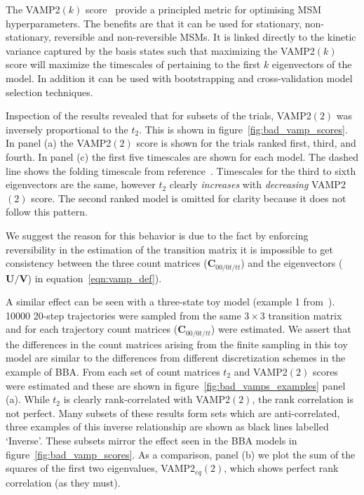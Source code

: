 \documentclass[journal=jacsat,manuscript=article]{achemso}
\begin{document}
The VAMP2$(k)$ score~\cite{wuVariationalApproachLearning2020c} provide a principled metric for optimising MSM hyperparameters. The benefits are that it can be used for stationary, non-stationary, reversible and non-reversible MSMs. It is linked directly to the kinetic variance captured by the basis states such that maximizing the VAMP2$(k)$ score will maximize the timescales of pertaining to the first $k$ eigenvectors of the model. In addition it can be used with bootstrapping and cross-validation model selection techniques. 

Inspection of the results revealed that for subsets of the trials, VAMP2$(2)$ was inversely proportional to the $t_2$. This is shown in figure~\ref{fig:bad_vamp_scores}. In panel (a) the VAMP2$(2)$ score is shown for the trials ranked first, third, and fourth. In panel (c) the first five timescales are shown for each model.  The dashed line shows the folding timescale from reference~\cite{lindorff-larsen_how_2011}. Timescales for the third to sixth eigenvectors are the same, however $t_2$ clearly \emph{increases} with \emph{decreasing} VAMP2$(2)$ score. The second ranked model is omitted for clarity because it does not follow this pattern. 

We suggest the reason for this behavior is due to the fact by enforcing reversibility in the estimation of the transition matrix it is impossible to get consistency between the three count matrices ($\mathbf{C}_{00/0t/tt}$) and the eigenvectors ($\mathbf{U}/\mathbf{V}$) in equation~\ref{eqn:vamp_def}). 

A similar effect can be seen with a three-state toy model (example 1 from~\cite{trendelkamp-schroer_estimation_2015}). \num{10000} 20-step trajectories were sampled from the same $3\times 3$ transition matrix and for each trajectory count matrices ($\mathbf{C}_{00/0t/tt}$) were estimated.  We assert that the differences in the count matrices arising from the finite sampling in this toy model are similar to the differences from different  discretization schemes in the example of BBA.  From each set of count matrices $t_2$ and VAMP2$(2)$ scores were estimated and  these are shown in figure~\ref{fig:bad_vamps_examples} panel (a). While  $t_2$ is clearly rank-correlated with VAMP2$(2)$, the rank correlation is not perfect.  Many subsets of these results  form sets which are anti-correlated,  three examples of this inverse relationship are shown as black lines labelled `Inverse'. These subsets mirror the effect seen in the BBA models in figure~\ref{fig:bad_vamp_scores}.  As a comparison, panel (b) we plot the sum of the squares of the first two eigenvalues, VAMP2$_{eq}(2)$, which shows perfect rank correlation (as they must). 
\end{document}
